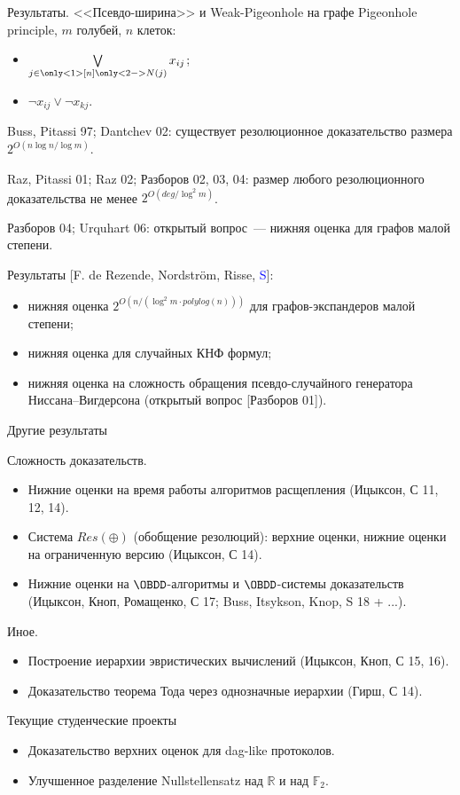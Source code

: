 \begin{frame}{Результаты. <<Псевдо-ширина>> и Weak-Pigeonhole на графе}
    Pigeonhole principle, $m$ голубей, $n$ клеток:
    \begin{itemize}
        \item $\bigvee\limits_{j \in \only<1>{[n]} \only<2->{N(j)}} x_{ij}$;
        \item $\neg x_{ij} \lor \neg x_{kj}$.
    \end{itemize}

    \pause
    \pause
    Buss, Pitassi 97; Dantchev 02: существует резолюционное доказательство размера
    $2^{O(n \log n / \log m)}$.

    \pause
    Raz, Pitassi 01; Raz 02; Разборов 02, 03, 04: размер любого резолюционного доказательства не менее
    $2^{O(deg / \log^2 m)}$.

    \pause
    Разборов 04; Urquhart 06: открытый вопрос~--- нижняя оценка для графов малой степени.

    \pause
    Результаты [F. de Rezende, Nordstr{\"{o}}m, Risse, \textcolor{blue}{S}]:
    \begin{itemize}
        \item нижняя оценка $2^{O(n / (\log^2 m \cdot polylog(n)))}$ для графов-экспандеров малой степени;
        \item нижняя оценка для случайных КНФ формул;
        \item нижняя оценка на сложность обращения псевдо-случайного генератора Ниссана--Вигдерсона
            (открытый вопрос [Разборов 01]).
    \end{itemize}
\end{frame}

\begin{frame}{Другие результаты}

    Сложность доказательств.
    \begin{itemize}
        \item Нижние оценки на время работы алгоритмов расщепления (Ицыксон, С 11, 12, 14).
        \pause
        \item Система $Res(\oplus)$ (обобщение резолюций): верхние оценки, нижние оценки на ограниченную
            версию (Ицыксон, С 14).
        \pause
        \item Нижние оценки на $\OBDD$-алгоритмы и $\OBDD$-системы доказательств (Ицыксон, Кноп,
            Ромащенко, С 17; Buss, Itsykson, Knop, S 18 + ...).
    \end{itemize}

    \pause
    Иное.
    \begin{itemize}
        \item Построение иерархии эвристических вычислений (Ицыксон, Кноп, С 15, 16).
        \pause
        \item Доказательство теорема Тода через однозначные иерархии (Гирш, С 14).
    \end{itemize}

\end{frame}


\begin{frame}{Текущие студенческие проекты}

    \begin{itemize}
        \item Доказательство верхних оценок для dag-like протоколов.
        \pause
        \item Улучшенное разделение Nullstellensatz над $\mathbb{R}$ и над $\mathbb{F}_2$.
    \end{itemize}
\end{frame}